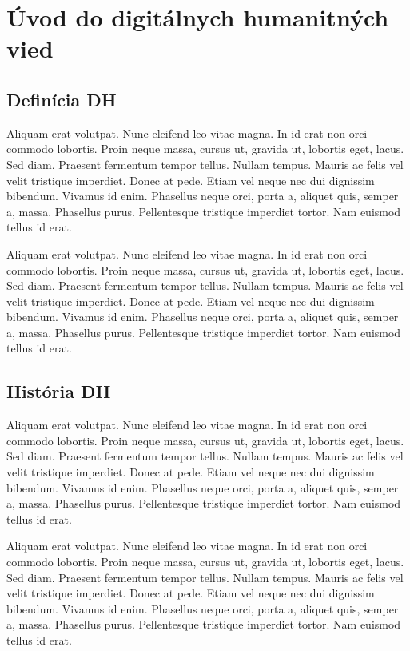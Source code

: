\documentclass[
  titlepage,
  openright,
  DIV=calc,
  toc=listof,
  listof=nochaptergap]{scrbook}
\begin{document}
\chapter{Úvod do digitálnych humanitných vied}\label{sec:uvod}

\section{Definícia DH}\label{definuxedcia-dh}

Aliquam erat volutpat. Nunc eleifend leo vitae magna. In id erat non
orci commodo lobortis. Proin neque massa, cursus ut, gravida ut,
lobortis eget, lacus. Sed diam. Praesent fermentum tempor tellus. Nullam
tempus. Mauris ac felis vel velit tristique imperdiet. Donec at pede.
Etiam vel neque nec dui dignissim bibendum. Vivamus id enim. Phasellus
neque orci, porta a, aliquet quis, semper a, massa. Phasellus purus.
Pellentesque tristique imperdiet tortor. Nam euismod tellus id erat.

Aliquam erat volutpat. Nunc eleifend leo vitae magna. In id erat non
orci commodo lobortis. Proin neque massa, cursus ut, gravida ut,
lobortis eget, lacus. Sed diam. Praesent fermentum tempor tellus. Nullam
tempus. Mauris ac felis vel velit tristique imperdiet. Donec at pede.
Etiam vel neque nec dui dignissim bibendum. Vivamus id enim. Phasellus
neque orci, porta a, aliquet quis, semper a, massa. Phasellus purus.
Pellentesque tristique imperdiet tortor. Nam euismod tellus id erat.

\section{História DH}\label{histuxf3ria-dh}

Aliquam erat volutpat. Nunc eleifend leo vitae magna. In id erat non
orci commodo lobortis. Proin neque massa, cursus ut, gravida ut,
lobortis eget, lacus. Sed diam. Praesent fermentum tempor tellus. Nullam
tempus. Mauris ac felis vel velit tristique imperdiet. Donec at pede.
Etiam vel neque nec dui dignissim bibendum. Vivamus id enim. Phasellus
neque orci, porta a, aliquet quis, semper a, massa. Phasellus purus.
Pellentesque tristique imperdiet tortor. Nam euismod tellus id erat.

Aliquam erat volutpat. Nunc eleifend leo vitae magna. In id erat non
orci commodo lobortis. Proin neque massa, cursus ut, gravida ut,
lobortis eget, lacus. Sed diam. Praesent fermentum tempor tellus. Nullam
tempus. Mauris ac felis vel velit tristique imperdiet. Donec at pede.
Etiam vel neque nec dui dignissim bibendum. Vivamus id enim. Phasellus
neque orci, porta a, aliquet quis, semper a, massa. Phasellus purus.
Pellentesque tristique imperdiet tortor. Nam euismod tellus id erat.
\end{document}
